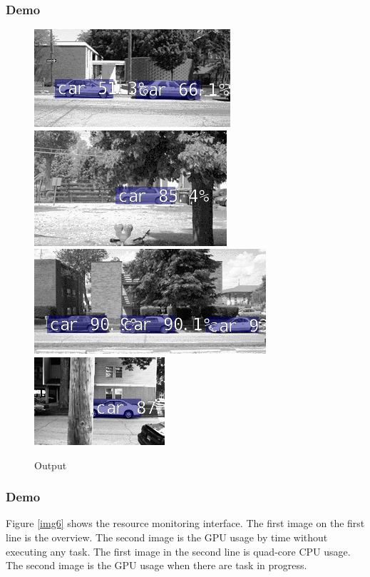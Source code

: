\documentclass{beamer}
\begin{document}
\begin{frame}
    \frametitle{Demo} 
    \begin{figure}[H]
        \centering
        \includegraphics[width=.4\textwidth]{img/output1.jpg}
        \includegraphics[width=.4\textwidth]{img/output2.jpg}
        \includegraphics[width=.4\textwidth]{img/output3.jpg}
        \includegraphics[width=.4\textwidth]{img/output4.jpg}
        \caption{Output}
        \label{img7}
    \end{figure}
\end{frame}
\begin{frame}
    \frametitle{Demo} 
    Figure \ref{img6} shows the resource monitoring interface. The first image on the first line is the overview. The second image is the GPU usage by time without executing any task. The first image in the second line is quad-core CPU usage. The second image is the GPU usage when there are task in progress.
\end{frame}
\end{document}
